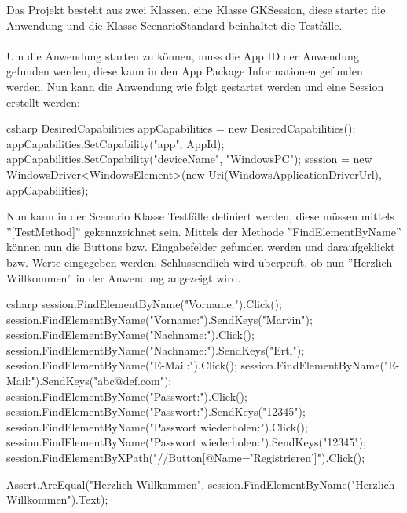 Das Projekt besteht aus zwei Klassen, eine Klasse GKSession, diese startet die Anwendung und die Klasse ScenarioStandard beinhaltet die Testfälle.
\\\\
Um die Anwendung starten zu können, muss die App ID der Anwendung gefunden werden, diese kann in den App Package Informationen gefunden werden. \cite{appid} Nun kann die Anwendung wie folgt gestartet werden und eine Session erstellt werden:

\begin{code}{csharp}
                DesiredCapabilities appCapabilities = new DesiredCapabilities();
appCapabilities.SetCapability("app", AppId);
appCapabilities.SetCapability("deviceName", "WindowsPC");
session = new WindowsDriver<WindowsElement>(new Uri(WindowsApplicationDriverUrl), appCapabilities);
\end{code}

Nun kann in der Scenario Klasse Testfälle definiert werden, diese müssen mittels ''[TestMethod]'' gekennzeichnet sein. Mittels der Methode ''FindElementByName'' können nun die Buttons bzw. Eingabefelder gefunden werden und daraufgeklickt bzw. Werte eingegeben werden. Schlussendlich wird überprüft, ob nun ''Herzlich Willkommen'' in der Anwendung angezeigt wird.

\begin{code}{csharp}
	session.FindElementByName("Vorname:").Click();
	session.FindElementByName("Vorname:").SendKeys("Marvin");
	session.FindElementByName("Nachname:").Click();
	session.FindElementByName("Nachname:").SendKeys("Ertl");
	session.FindElementByName("E-Mail:").Click();
	session.FindElementByName("E-Mail:").SendKeys("abc@def.com");
	session.FindElementByName("Passwort:").Click();
	session.FindElementByName("Passwort:").SendKeys("12345");
	session.FindElementByName("Passwort wiederholen:").Click();
	session.FindElementByName("Passwort wiederholen:").SendKeys("12345");
	session.FindElementByXPath("//Button[@Name='Registrieren']").Click();
	
	Assert.AreEqual("Herzlich Willkommen", session.FindElementByName("Herzlich Willkommen").Text);
\end{code}

